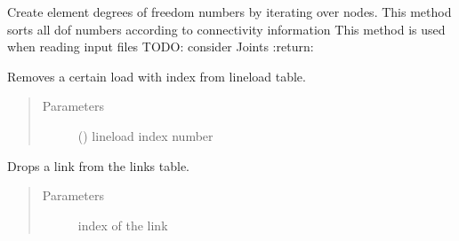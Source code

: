 \documentclass[letterpaper,10pt,english]{sphinxmanual}
\begin{document}
\begin{fulllineitems}
\begin{fulllineitems}
\begin{quote}
\begin{description}
\end{description}\end{quote}

\end{fulllineitems}


\begin{fulllineitems}
\label{\detokenize{api:beamon.database.Database.make_edof}}
Create element degrees of freedom numbers by iterating over nodes.
This method sorts all dof numbers according to connectivity information
This method is used when reading input files
TODO: consider Joints
:return:

\end{fulllineitems}


\begin{fulllineitems}
\label{\detokenize{api:beamon.database.Database.remove_lineload}}
Removes a certain load with index from lineload table.
\begin{quote}\begin{description}
\item[{Parameters}] \leavevmode
{} () \textendash{} lineload index number

\end{description}\end{quote}

\end{fulllineitems}


\begin{fulllineitems}
\label{\detokenize{api:beamon.database.Database.remove_link}}
Drops a link from the links table.
\begin{quote}\begin{description}
\item[{Parameters}] \leavevmode
{} \textendash{} index of the link


\end{description}
\end{quote}
\end{fulllineitems}
\end{fulllineitems}
\end{document}
